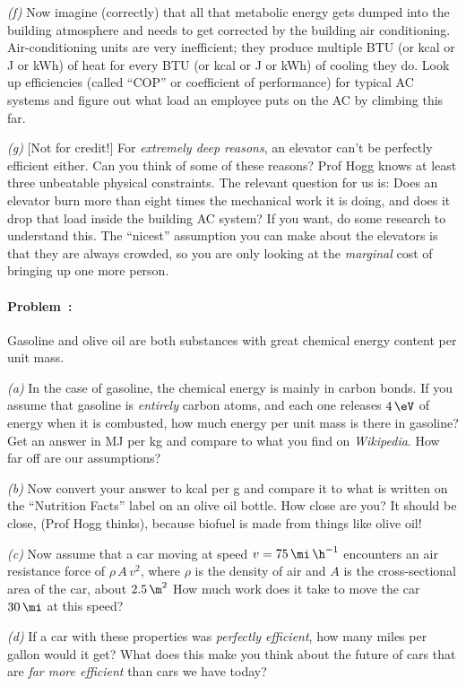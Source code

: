 \documentclass[12pt]{article}
\newcounter{problem}
\begin{document}
\textsl{(f)} Now imagine (correctly) that all that metabolic energy
gets dumped into the building atmosphere and needs to get corrected by
the building air conditioning. Air-conditioning units are very
inefficient; they produce multiple BTU (or kcal or J or kWh) of heat
for every BTU (or kcal or J or kWh) of cooling they do. Look up
efficiencies (called ``COP'' or coefficient of performance)
for typical AC systems and figure out what load an
employee puts on the AC by climbing this far.

\textsl{(g)} [Not for credit!] For \emph{extremely deep reasons}, an
elevator can't be perfectly efficient either. Can you think of some of
these reasons? Prof Hogg knows at least three unbeatable physical
constraints. The relevant question for us is: Does an elevator burn
more than eight times the mechanical work it is doing, and does it
drop that load inside the building AC system? If you want, do some
research to understand this. The ``nicest'' assumption you can make
about the elevators is that they are always crowded, so you are only
looking at the \emph{marginal} cost of bringing up one more person.

\paragraph{Problem~\theproblem:}%
Gasoline and olive oil are both substances with great chemical energy
content per unit mass.

\textsl{(a)} In the case of gasoline, the chemical energy is mainly in
carbon bonds.  If you assume that gasoline is \emph{entirely} carbon
atoms, and each one releases $4\,\eV$ of energy when it is combusted, how
much energy per unit mass is there in gasoline?  Get an answer in MJ
per kg and compare to what you find on \textit{Wikipedia}.  How far off
are our assumptions?

\textsl{(b)} Now convert your answer to kcal per g and compare it to
what is written on the ``Nutrition Facts'' label on an olive oil
bottle.  How close are you?  It should be close, (Prof Hogg thinks), because
biofuel is made from things like olive oil!

\textsl{(c)} Now assume that a car moving at speed
$v=75\,\mi\,\h^{-1}$ encounters an air resistance force of
$\rho\,A\,v^2$, where $\rho$ is the density of air and $A$ is the
cross-sectional area of the car, about $2.5\,\m^2$ How much work does it
take to move the car $30\,\mi$ at this speed?

\textsl{(d)} If a car with these properties was \emph{perfectly
  efficient}, how many miles per gallon would it get?  What does this
make you think about the future of cars that are \emph{far more
  efficient} than cars we have today?
\end{document}
